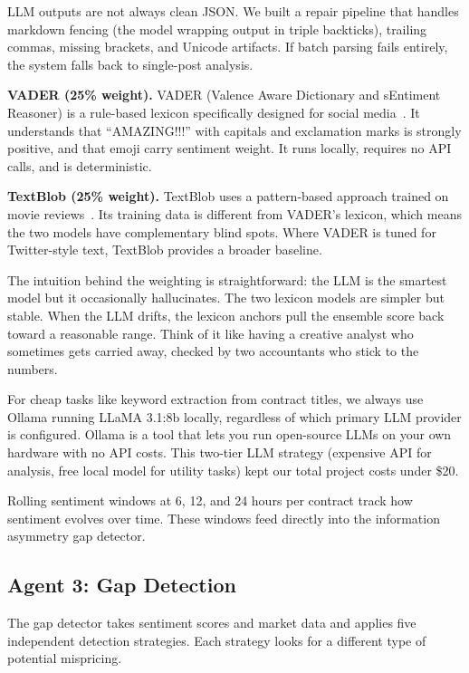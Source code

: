 \documentclass[conference]{IEEEtran}
\begin{document}
LLM outputs are not always clean JSON. We built a repair pipeline that handles markdown fencing (the model wrapping output in triple backticks), trailing commas, missing brackets, and Unicode artifacts. If batch parsing fails entirely, the system falls back to single-post analysis.

\textbf{VADER (25\% weight).} VADER (Valence Aware Dictionary and sEntiment Reasoner) is a rule-based lexicon specifically designed for social media~\cite{hutto2014}. It understands that ``AMAZING!!!'' with capitals and exclamation marks is strongly positive, and that emoji carry sentiment weight. It runs locally, requires no API calls, and is deterministic.

\textbf{TextBlob (25\% weight).} TextBlob uses a pattern-based approach trained on movie reviews~\cite{loria2020}. Its training data is different from VADER's lexicon, which means the two models have complementary blind spots. Where VADER is tuned for Twitter-style text, TextBlob provides a broader baseline.

The intuition behind the weighting is straightforward: the LLM is the smartest model but it occasionally hallucinates. The two lexicon models are simpler but stable. When the LLM drifts, the lexicon anchors pull the ensemble score back toward a reasonable range. Think of it like having a creative analyst who sometimes gets carried away, checked by two accountants who stick to the numbers.

For cheap tasks like keyword extraction from contract titles, we always use Ollama running LLaMA 3.1:8b locally, regardless of which primary LLM provider is configured. Ollama is a tool that lets you run open-source LLMs on your own hardware with no API costs. This two-tier LLM strategy (expensive API for analysis, free local model for utility tasks) kept our total project costs under \$20.

Rolling sentiment windows at 6, 12, and 24 hours per contract track how sentiment evolves over time. These windows feed directly into the information asymmetry gap detector.

\subsection{Agent 3: Gap Detection}

The gap detector takes sentiment scores and market data and applies five independent detection strategies. Each strategy looks for a different type of potential mispricing.
\end{document}
